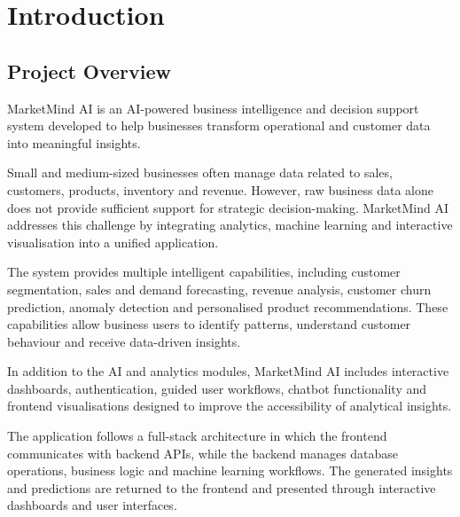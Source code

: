 \documentclass[12pt,a4paper]{report}
\begin{document}
\listoffigures

\newpage


\listoftables

\newpage


\chapter{Introduction}

\section{Project Overview}

MarketMind AI is an AI-powered business intelligence and decision
support system developed to help businesses transform operational and
customer data into meaningful insights.

Small and medium-sized businesses often manage data related to sales,
customers, products, inventory and revenue. However, raw business data
alone does not provide sufficient support for strategic decision-making.
MarketMind AI addresses this challenge by integrating analytics,
machine learning and interactive visualisation into a unified
application.

The system provides multiple intelligent capabilities, including
customer segmentation, sales and demand forecasting, revenue analysis,
customer churn prediction, anomaly detection and personalised product
recommendations. These capabilities allow business users to identify
patterns, understand customer behaviour and receive data-driven
insights.

In addition to the AI and analytics modules, MarketMind AI includes
interactive dashboards, authentication, guided user workflows,
chatbot functionality and frontend visualisations designed to improve
the accessibility of analytical insights.

The application follows a full-stack architecture in which the frontend
communicates with backend APIs, while the backend manages database
operations, business logic and machine learning workflows. The
generated insights and predictions are returned to the frontend and
presented through interactive dashboards and user interfaces.
\end{document}

